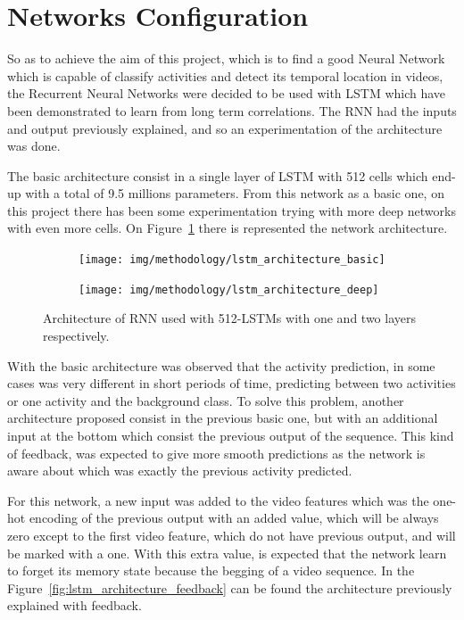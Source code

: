 \section{Networks Configuration}

So as to achieve the aim of this project, which is to find a good Neural Network which is capable of classify activities and detect its temporal location in videos, the Recurrent Neural Networks were decided to be used with LSTM which have been demonstrated to learn from long term correlations. The RNN had the inputs and output previously explained, and so an experimentation of the architecture was done. 

The basic architecture consist in a single layer of LSTM with 512 cells which end-up with a total of 9.5 millions parameters. From this network as a basic one, on this project there has been some experimentation trying with more deep networks with even more cells. On Figure~\ref{fig:lstm_architecture} there is represented the network architecture.

\begin{figure}[H]
\centering
\begin{subfigure}[b]{.5\textwidth}
  \centering
  \texttt{[image: img/methodology/lstm\_architecture\_basic]}
\end{subfigure}%
\begin{subfigure}[b]{.5\textwidth}
  \centering
  \texttt{[image: img/methodology/lstm\_architecture\_deep]}
\end{subfigure}
\caption{Architecture of RNN used with 512-LSTMs with one and two layers respectively.}
\label{fig:lstm_architecture}
\end{figure}

With the basic architecture was observed that the activity prediction, in some cases was very different in short periods of time, predicting between two activities or one activity and the background class. To solve this problem, another architecture proposed consist in the previous basic one, but with an additional input at the bottom which consist the previous output of the sequence. This kind of feedback, was expected to give more smooth predictions as the network is aware about which was exactly the previous activity predicted.

For this network, a new input was added to the video features which was the one-hot encoding of the previous output with an added value, which will be always zero except to the first video feature, which do not have previous output, and will be marked with a one. With this extra value, is expected that the network learn to forget its memory state because the begging of a video sequence. In the Figure~\ref{fig:lstm_architecture_feedback} can be found the architecture previously explained with feedback.

